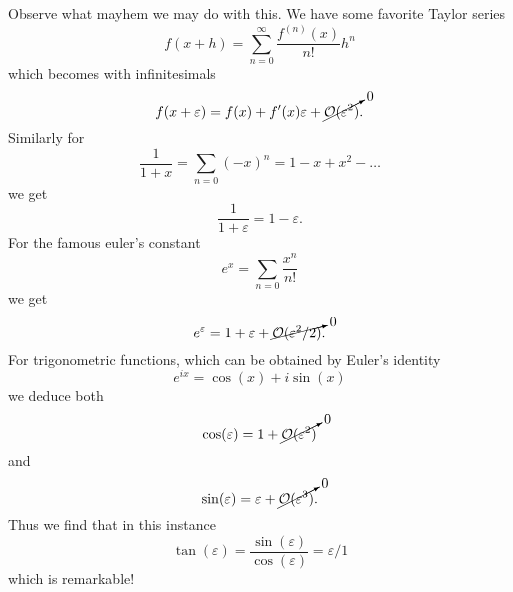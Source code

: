 Observe what mayhem we may do with this. We have some favorite Taylor series
\begin{equation}
f(x + h) = \sum_{n=0}^{\infty}\frac{f^{(n)}(x)}{n!}h^n
\end{equation}
which becomes with infinitesimals
\begin{equation}\label{classicTaylor}
f(x + \varepsilon) = f(x) + f'(x)\varepsilon + \cancelto{0}{\mathcal{O}(\varepsilon^2)}.
\end{equation}
Similarly for
\begin{equation}
\frac{1}{1 + x} = \sum_{n=0} (-x)^n = 1 - x + x^2 - \ldots
\end{equation}
we get
\begin{equation}
\frac{1}{1 + \varepsilon} = 1 - \varepsilon.
\end{equation}
For the famous euler's constant
\begin{equation}
e^x = \sum_{n=0}\frac{x^n}{n!}
\end{equation}
we get
\begin{equation}
e^\varepsilon = 1 + \varepsilon + \cancelto{0}{\mathcal{O}(\varepsilon^2/2)}.
\end{equation}
For trigonometric functions, which can be obtained by Euler's identity
\begin{equation}
e^{ix} = \cos(x) + i\sin(x)
\end{equation}
we deduce both
\begin{equation}
\cos(\varepsilon) = 1 + \cancelto{0}{\mathcal{O}(\varepsilon^2)}
\end{equation}
and
\begin{equation}
\sin(\varepsilon) = \varepsilon + \cancelto{0}{\mathcal{O}(\varepsilon^3)}.
\end{equation}
Thus we find that in this instance
\begin{equation}
\tan(\varepsilon) = \frac{\sin(\varepsilon)}{\cos(\varepsilon)} = \varepsilon/1
\end{equation}
which is remarkable!
